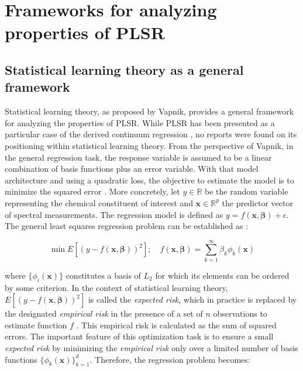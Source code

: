 \documentclass[preprint,12pt]{elsarticle}
\begin{document}

\section{Frameworks for analyzing properties of PLSR}

\subsection{Statistical learning theory as a general framework}

Statistical learning theory, as proposed by Vapnik\cite{Vapnik2019,Vapnik2000,Chapelle2002}, provides a general framework for analyzing the properties of PLSR. While PLSR has been presented as a particular case of the derived continuum regression \cite{Stone1990}, no reports were found on its positioning within statistical learning theory. From the perspective of Vapnik, in the general regression task, the response variable is assumed to be a linear combination of basis functions plus an error variable. With that model architecture and using a quadratic loss, the objective to estimate the model is to minimize the squared error \cite{Chapelle2002}. More concretely, let $y \in \mathbb{R}$ be the random variable representing the chemical constituent of interest and  $\mathbf{x} \in \mathbb{R}^{p}$ the predictor vector of spectral measurements. The regression model is defined as $y = f(\mathbf{x}, \boldsymbol{\beta}) + \epsilon$.  The general least squares regression problem can be established as \cite{Chapelle2002}:

\begin{equation}
    \min E \left[ (y-f(\mathbf{x}, \boldsymbol{\beta}))^2\right]; \quad f(\mathbf{x}, \boldsymbol{\beta}) = \sum_{k=1}^{\infty} \beta_k \phi_{k}(\mathbf{x})
    \label{eq_general_regression_problem}
\end{equation}

where $\{\phi_{i}(\mathbf{x})\}$ constitutes a basis of $L_2$ for which its elements can be ordered by some criterion. In the context of statistical learning theory, $E \left[ (y-f(\mathbf{x}, \boldsymbol{\beta}))^2\right]$ is called the \emph{expected risk}, which in practice is replaced by the designated \emph{empirical risk} in the presence of a set of $n$ observations to estimate function $f$ \cite{Vapnik2000}. This empirical risk is calculated as the sum of squared errors. The important feature of this optimization task is to ensure a small \emph{expected risk} by minimizing the \emph{empirical risk} only over a limited number of basis functions $\{\phi_{k}(\mathbf{x})\}_{k=1}^d$. Therefore, the regression problem becomes:
\end{document}
